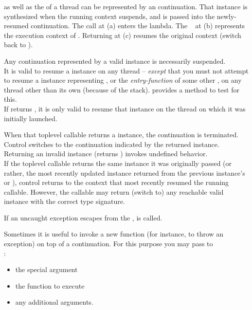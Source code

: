 \label{subsec:main}

\main as well as the \entryfn of a thread can be represented by an continuation.
That \cont instance is synthesized when the running context suspends, and is
passed into the newly-resumed continuation.
The  call at (a) enters the lambda. The \cont\  at (b)
represents the execution context of \main. Returning  at (c) resumes the
original context (switch back to \main).


Any continuation represented by a valid \cont instance is necessarily suspended.\\
It is valid to resume a \cont instance on any thread -- \emph{except} that you
must not attempt to resume a \cont instance representing \main, or
the \emph{entry-function} of some other , on any thread other
than its own (because of the stack). \cont provides a method to test for this.\\
If  returns , it is
only valid to resume that \cont instance on the thread on which it was initially
launched.


When that toplevel callable returns a \cont instance, the continuation is
terminated. Control switches to the continuation indicated by the returned \cont
instance.\\
Returning an invalid \cont instance (\opbool returns ) invokes
undefined behavior.\\
If the toplevel callable returns the same \cont instance it was originally
passed (or rather, the most recently updated instance returned from the
previous instance's \call or \resume), control returns to the context that most
recently resumed the running callable. However, the callable may return (switch
to) any reachable valid \cont instance with the correct type signature.


\label{subsec:exceptions}
If an uncaught exception escapes from the \entryfn,  is
called.


Sometimes it is useful to invoke a new function (for instance, to throw an
exception) on top of a continuation. For this purpose you may pass to\\
:

\begin{itemize}
  \item the special argument 
  \item the function to execute
  \item any additional arguments.
\end{itemize}

